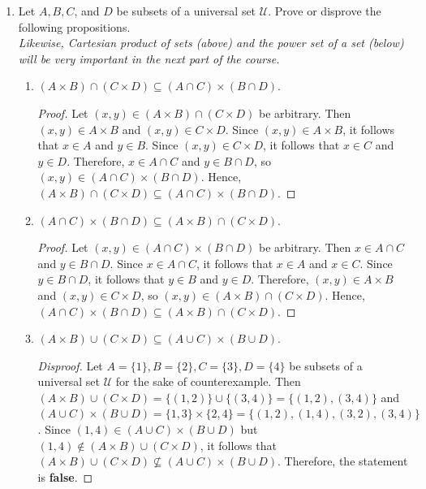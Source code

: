 \documentclass{article}
\theoremstyle{definition}
\begin{document}
\begin{enumerate}
  \newpage
  \item Let $A, B, C$, and $D$ be subsets of a universal set $\mathcal{U}$. 
  Prove or disprove the following propositions.\\
  \textit{Likewise, Cartesian product of sets (above) and the power set of a set (below) will be very important in the next part of the course.}
  \begin{enumerate}
  \item $(A \times B) \cap(C \times D) \subseteq(A \cap C) \times(B \cap D)$.
  \begin{proof}
    Let $(x,y) \in (A \times B) \cap(C \times D)$ be arbitrary. Then $(x,y) \in A \times B$ and $(x,y) \in C \times D$. Since $(x,y) \in A \times B$, it follows that $x \in A$ and $y \in B$. Since $(x,y) \in C \times D$, it follows that $x \in C$ and $y \in D$. Therefore, $x \in A \cap C$ and $y \in B \cap D$, so $(x,y) \in (A \cap C) \times(B \cap D)$. Hence, $(A \times B) \cap(C \times D) \subseteq(A \cap C) \times(B \cap D)$.
  \end{proof}

  \item $(A \cap C) \times(B \cap D) \subseteq(A \times B) \cap(C \times D)$.
  \begin{proof}
    Let $(x,y) \in (A \cap C) \times(B \cap D)$ be arbitrary. Then $x \in A \cap C$ and $y \in B \cap D$. Since $x \in A \cap C$, it follows that $x \in A$ and $x \in C$. Since $y \in B \cap D$, it follows that $y \in B$ and $y \in D$. Therefore, $(x,y) \in A \times B$ and $(x,y) \in C \times D$, so $(x,y) \in (A \times B) \cap(C \times D)$. Hence, $(A \cap C) \times(B \cap D) \subseteq(A \times B) \cap(C \times D)$.
  \end{proof}

  \item $(A \times B) \cup(C \times D) \subseteq(A \cup C) \times(B \cup D)$.
  \begin{proof}[Disproof]
    Let $A=\{1\}, B=\{2\}, C=\{3\}, D=\{4\}$ be subsets of a universal set $\mathcal{U}$ for the sake of counterexample. Then $(A \times B) \cup(C \times D)=\{(1,2)\} \cup \{(3,4)\}=\{(1,2),(3,4)\}$ and $(A \cup C) \times(B \cup D)=\{1,3\} \times \{2,4\}=\{(1,2),(1,4),(3,2),(3,4)\}$. Since $(1,4) \in (A \cup C) \times(B \cup D)$ but $(1,4) \notin (A \times B) \cup(C \times D)$, it follows that $(A \times B) \cup(C \times D) \not\subseteq (A \cup C) \times(B \cup D)$. Therefore, the statement is \textbf{false}.
  \end{proof}


\end{enumerate}
\end{enumerate}
\end{document}
